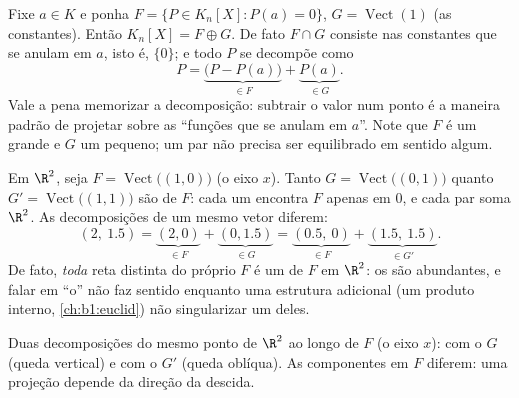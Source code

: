 \begin{example}
\label{ex:b1:vspaces:hyperplane}
Fixe $a \in K$ e ponha $F = \{P \in K_n[X] : P(a) = 0\}$, $G =
\operatorname{Vect}(1)$ (as constantes). Então $K_n[X] = F \oplus
G$. De
fato $F \cap G$ consiste nas constantes que se anulam em $a$, isto é,
$\{0\}$; e todo $P$ se decompõe como
\[
P = \underbrace{\bigl(P - P(a)\bigr)}_{\in F}
+ \underbrace{P(a)}_{\in G} .
\]
Vale a pena memorizar a decomposição: subtrair o valor num ponto é a
maneira padrão de projetar sobre as ``funções que se anulam em
$a$''. Note que $F$ é um  grande e $G$ um pequeno; um par
 não precisa ser equilibrado em sentido algum.
\end{example}

\begin{example}
\label{ex:b1:vspaces:manysupplements}
Em $\R^2$, seja $F = \operatorname{Vect}\bigl((1,0)\bigr)$ (o eixo $x$). Tanto $G = \operatorname{Vect}\bigl((0,1)\bigr)$ quanto $G' = \operatorname{Vect}\bigl((1,1)\bigr)$ são
 de $F$: cada um encontra $F$ apenas em $0$, e cada par
soma $\R^2$. As decomposições de um mesmo vetor diferem:
\[
(2,\ 1.5) = \underbrace{(2, 0)}_{\in F} +
\underbrace{(0, 1.5)}_{\in G}
= \underbrace{(0.5,\ 0)}_{\in F} +
\underbrace{(1.5,\ 1.5)}_{\in G'} .
\]
De fato, \emph{toda} reta distinta do próprio $F$ é um  de
$F$ em $\R^2$: os  são abundantes, e falar em ``o''
 não faz sentido enquanto uma estrutura adicional (um
produto interno, \cref{ch:b1:euclid}) não singularizar um deles.
\end{example}

\begin{omfigure}

{\small Duas decomposições do mesmo ponto de $\R^2$ ao longo de $F$
(o eixo $x$): com o  $G$ (queda vertical) e com o
 $G'$ (queda oblíqua). As componentes em $F$ diferem:
uma projeção depende da direção da descida.}
\end{omfigure}

